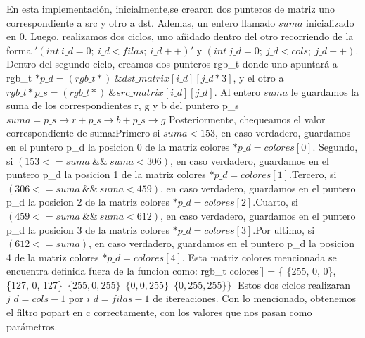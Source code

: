 En esta implementación, inicialmente,se crearon dos punteros de matriz uno correspondiente a src y otro a dst.\newline 
Ademas, un entero llamado $suma$ inicializado en 0. \newline
Luego, realizamos dos ciclos, uno añidado dentro del otro recorriendo de la forma $'(int\ i\_d = 0;\ i\_d < filas;\ i\_d++)'$ y 
$(int\ j\_d = 0;\ j\_d < cols;\ j\_d++)$.\newline
Dentro del segundo ciclo, creamos dos punteros rgb\_t donde uno apuntará a \newline rgb\_t $*p\_d = (rgb\_t*)\  \&dst\_matrix[i\_d][j\_d*3]$, y el otro
a $rgb\_t *p\_s = (rgb\_t*)\ \&src\_matrix[i\_d][j\_d]$.\newline
Al entero $suma$ le guardamos la suma de los correspondientes r, g y b del puntero p\_s $suma = p\_s\rightarrow r + p\_s\rightarrow b + p\_s\rightarrow g$ \newline
Posteriormente, chequeamos el valor correspondiente de suma:\newline Primero si $suma < 153$, en caso verdadero, guardamos en el puntero p\_d la posicion 0 de la matriz colores
$*p\_d = colores[0]$. \newline Segundo, si $(153 <= suma \  \&\& \ suma < 306)$, en caso verdadero, guardamos en el puntero p\_d la posicion 1 de la matriz colores
$*p\_d = colores[1]$.\newline Tercero, si $(306 <= suma \  \&\& \  suma < 459)$, en caso verdadero, guardamos en el puntero p\_d la posicion 2 de la matriz colores
$*p\_d = colores[2]$.\newline Cuarto, si $(459 <= suma \  \&\& \  suma < 612)$, en caso verdadero, guardamos en el puntero p\_d la posicion 3 de la matriz colores
$*p\_d = colores[3]$.\newline Por ultimo, si $(612 <= suma)$, en caso verdadero, guardamos en el puntero p\_d la posicion 4 de la matriz colores
$*p\_d = colores[4]$.\newline
Esta matriz colores mencionada se encuentra definida fuera de la funcion como:\newline \noindent
rgb\_t colores[] =  \{ \{255,   0,   0\},\newline
    \hspace*{2.8cm}  \{127,   0, 127\}\,\newline
    \hspace*{2.8cm}               $\{255,   0, 255\}\,$\newline
     \hspace*{2.8cm}              $\{  0,   0, 255\}\,$\newline
	\hspace*{2.8cm}	     $\{  0, 255, 255\} \}\;$
\vspace*{0.3cm} \noindent\newline
Estos dos ciclos realizaran $j\_d = cols - 1$  por $i\_d = filas -1$ de itereaciones.\newline
Con lo mencionado, obtenemos el filtro popart en c correctamente, con los valores que nos pasan como parámetros.\newline

